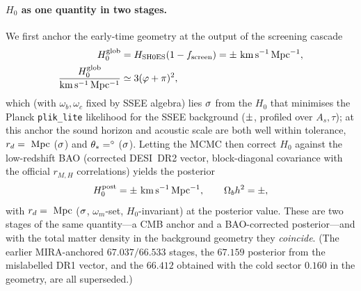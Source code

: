 \documentclass[aps,prd,preprint,amsmath,amssymb,nofootinbib,longbibliography]{revtex4-2}
\newcommand{\kms}{\mathrm{km\,s^{-1}\,Mpc^{-1}}}
\begin{document}
\paragraph{$H_0$ as one quantity in two stages.} We first anchor the
early-time geometry at the output of the screening cascade
\begin{equation}
  \begin{aligned}
  H_0^{\rm glob} &= H_{\rm SH0ES}(1-f_{\rm screen}) = \val{H0_GLOBAL_d3}\pm\val{p9_hglob_sigma}~\kms ,\\
  \frac{H_0^{\rm glob}}{\kms} &\simeq 3(\varphi+\pi)^2 ,
  \end{aligned}
  \label{eq:h0anchor}
\end{equation}
which (with $\omega_b,\omega_c$ fixed by SSEE algebra) lies $\val{perfil_h0_d}\sigma$ from the $H_0$ that
minimises the Planck \texttt{plik\_lite} likelihood for the SSEE background ($\val{perfil_h0_min}\pm\val{perfil_h0_sig}$, profiled over $A_s,\tau$); at this anchor the
sound horizon and acoustic scale are both well within tolerance,
$r_d = \val{p2_lyaB_rd}~\mathrm{Mpc}$ ($\val{p3_rd_sig_anc}\sigma$) and
$\theta_\ast = \val{p3_th_deg_anc}^\circ$ ($\val{p3_th_sig_anc}\sigma$). Letting the MCMC then correct
$H_0$ against the low-redshift BAO (corrected DESI~DR2 vector, block-diagonal
covariance with the official $r_{M,H}$ correlations) yields the posterior
\begin{equation}
  H_0^{\mathrm{post}} = \val{h0_p2}\pm\val{h0_p2_s}~\kms ,
  \qquad
  \Omega_b h^2 = \val{p2_obh2} \pm \val{p2_obh2_s} ,
  \label{eq:h0post}
\end{equation}
with $r_d = \val{p2_lyaB_rd}~\mathrm{Mpc}$ ($\val{p3_rd_sig_post}\sigma$, $\omega_m$-set, $H_0$-invariant)
at the posterior value. These are two stages of the same quantity---a CMB
anchor and a BAO-corrected posterior---and with the total matter density in the
background geometry they \emph{coincide}. (The earlier MIRA-anchored
$67.037/66.533$ stages, the $67.159$ posterior from the mislabelled DR1 vector,
and the $66.412$ obtained with the cold sector $0.160$ in the geometry, are all
superseded.)
\end{document}
